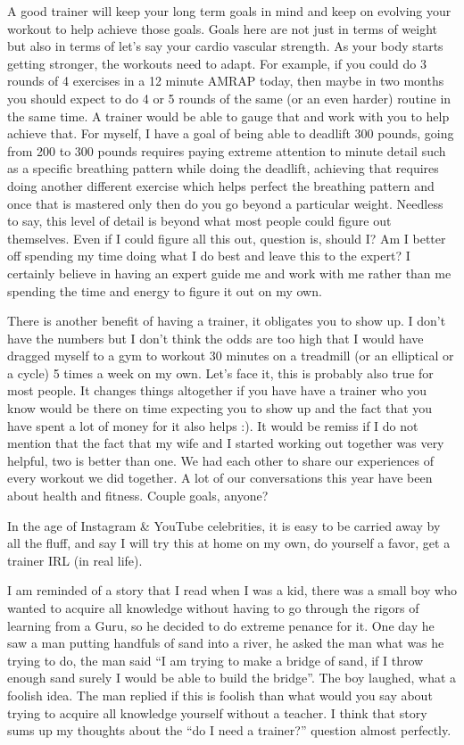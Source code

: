 \documentclass[
  oneside]{book}
\begin{document}
A good trainer will keep your long term goals in mind and keep on evolving your workout to help achieve those goals. Goals here are not just in terms of weight but also in terms of let's say your cardio vascular strength. As your body starts getting stronger, the workouts need to adapt. For example, if you could do 3 rounds of 4 exercises in a 12 minute AMRAP today, then maybe in two months you should expect to do 4 or 5 rounds of the same (or an even harder) routine in the same time. A trainer would be able to gauge that and work with you to help achieve that. For myself, I have a goal of being able to deadlift 300 pounds, going from 200 to 300 pounds requires paying extreme attention to minute detail such as a specific breathing pattern while doing the deadlift, achieving that requires doing another different exercise which helps perfect the breathing pattern and once that is mastered only then do you go beyond a particular weight. Needless to say, this level of detail is beyond what most people could figure out themselves. Even if I could figure all this out, question is, should I? Am I better off spending my time doing what I do best and leave this to the expert? I certainly believe in having an expert guide me and work with me rather than me spending the time and energy to figure it out on my own.

There is another benefit of having a trainer, it obligates you to show up. I don't have the numbers but I don't think the odds are too high that I would have dragged myself to a gym to workout 30 minutes on a treadmill (or an elliptical or a cycle) 5 times a week on my own. Let's face it, this is probably also true for most people. It changes things altogether if you have have a trainer who you know would be there on time expecting you to show up and the fact that you have spent a lot of money for it also helps :). It would be remiss if I do not mention that the fact that my wife and I started working out together was very helpful, two is better than one. We had each other to share our experiences of every workout we did together. A lot of our conversations this year have been about health and fitness. Couple goals, anyone?

In the age of Instagram \& YouTube celebrities, it is easy to be carried away by all the fluff, and say I will try this at home on my own, do yourself a favor, get a trainer IRL (in real life).

I am reminded of a story that I read when I was a kid, there was a small boy who wanted to acquire all knowledge without having to go through the rigors of learning from a Guru, so he decided to do extreme penance for it. One day he saw a man putting handfuls of sand into a river, he asked the man what was he trying to do, the man said ``I am trying to make a bridge of sand, if I throw enough sand surely I would be able to build the bridge''. The boy laughed, what a foolish idea. The man replied if this is foolish than what would you say about trying to acquire all knowledge yourself without a teacher. I think that story sums up my thoughts about the ``do I need a trainer?'' question almost perfectly.
\end{document}
